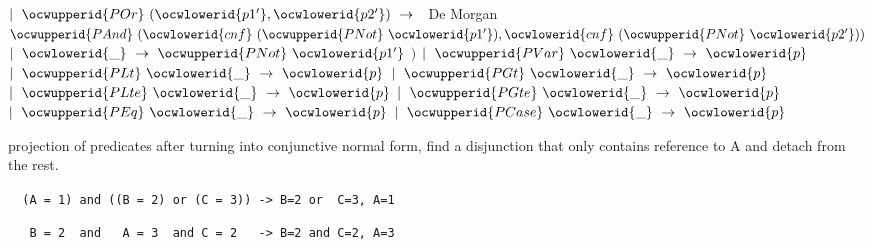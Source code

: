 \documentclass[12pt]{article}
\begin{document}
\ocwindent{2.50em}
$\mid{}~\ocwupperid{POr}~(\ocwlowerid{p1'},\ocwlowerid{p2'})~\rightarrow{}~$\ocwbc{} De Morgan \ocwec{}~$\ocwupperid{PAnd}~(\ocwlowerid{cnf}~(\ocwupperid{PNot}~\ocwlowerid{p1'}),\ocwlowerid{cnf}~(\ocwupperid{PNot}~\ocwlowerid{p2'}))$\ocweol
\ocwindent{2.50em}
$\mid{}~\ocwlowerid{\_}~\rightarrow{}~\ocwupperid{PNot}~\ocwlowerid{p1'}$\ocweol
\ocwindent{2.50em}
$)$\ocweol
\ocwindent{0.50em}
$\mid{}~\ocwupperid{PVar}~\ocwlowerid{\_}~\rightarrow{}~\ocwlowerid{p}$\ocweol
\ocwindent{0.50em}
$\mid{}~\ocwupperid{PLt}~\ocwlowerid{\_}~\rightarrow{}~\ocwlowerid{p}$\ocweol
\ocwindent{0.50em}
$\mid{}~\ocwupperid{PGt}~\ocwlowerid{\_}~\rightarrow{}~\ocwlowerid{p}$\ocweol
\ocwindent{0.50em}
$\mid{}~\ocwupperid{PLte}~\ocwlowerid{\_}~\rightarrow{}~\ocwlowerid{p}$\ocweol
\ocwindent{0.50em}
$\mid{}~\ocwupperid{PGte}~\ocwlowerid{\_}~\rightarrow{}~\ocwlowerid{p}$\ocweol
\ocwindent{0.50em}
$\mid{}~\ocwupperid{PEq}~\ocwlowerid{\_}~\rightarrow{}~\ocwlowerid{p}$\ocweol
\ocwindent{0.50em}
$\mid{}~\ocwupperid{PCase}~\ocwlowerid{\_}~\rightarrow{}~\ocwlowerid{p}$\medskip

\ocwendcode{}\ocwindent{0.00em}
projection of predicates 
\ocweol
\ocwindent{0.00em}
after turning into conjunctive normal form, 
   find a disjunction that only contains reference to A 
   and detach from the rest.

 \verb|  (A = 1) and ((B = 2) or (C = 3)) -> B=2 or  C=3, A=1 |

 \verb|   B = 2  and   A = 3  and C = 2   -> B=2 and C=2, A=3 |
 
\end{document}
